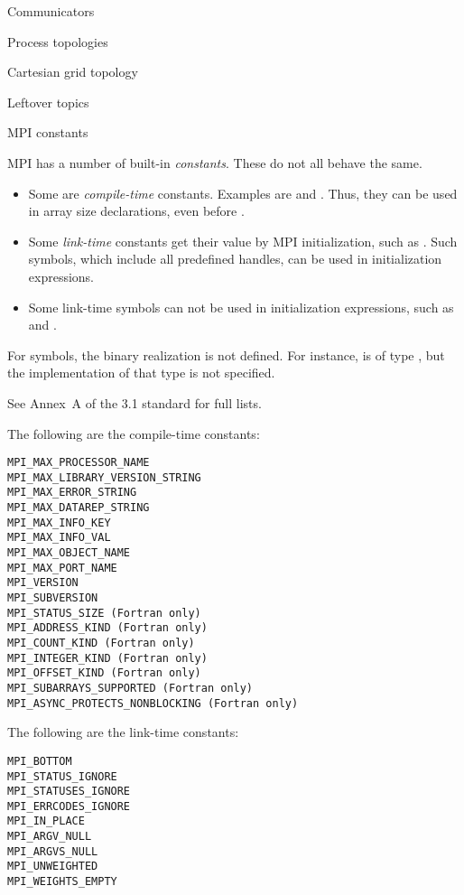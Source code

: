  {Communicators}

 {Process topologies}
\label{sec:ref:topology}

 {Cartesian grid topology}
\label{sec:ref:cartesian}

 {Leftover topics}

 {MPI constants}

MPI has a number of built-in \emph{constants}. These do not all behave
the same.
\begin{itemize}
\item Some are \emph{compile-time}
  constants. Examples are  and
  . Thus, they can be used in
  array size declarations, even before .
\item Some \emph{link-time}
  constants get their value by MPI initialization, such as
  . Such symbols, which include all
  predefined handles, can be used in initialization expressions.
\item Some link-time symbols can not be used in initialization
  expressions, such as  and .
\end{itemize}

For symbols, the binary realization is not defined. For instance,
 is of type , but
the implementation of that type is not specified.

See Annex~A of the 3.1 standard for full lists.

The following are the compile-time constants:
\begin{lstlisting}
MPI_MAX_PROCESSOR_NAME
MPI_MAX_LIBRARY_VERSION_STRING
MPI_MAX_ERROR_STRING
MPI_MAX_DATAREP_STRING
MPI_MAX_INFO_KEY
MPI_MAX_INFO_VAL
MPI_MAX_OBJECT_NAME
MPI_MAX_PORT_NAME
MPI_VERSION
MPI_SUBVERSION
MPI_STATUS_SIZE (Fortran only)
MPI_ADDRESS_KIND (Fortran only)
MPI_COUNT_KIND (Fortran only)
MPI_INTEGER_KIND (Fortran only)
MPI_OFFSET_KIND (Fortran only)
MPI_SUBARRAYS_SUPPORTED (Fortran only)
MPI_ASYNC_PROTECTS_NONBLOCKING (Fortran only)
\end{lstlisting}

The following are the link-time constants:
\begin{lstlisting}
MPI_BOTTOM
MPI_STATUS_IGNORE
MPI_STATUSES_IGNORE
MPI_ERRCODES_IGNORE
MPI_IN_PLACE
MPI_ARGV_NULL
MPI_ARGVS_NULL
MPI_UNWEIGHTED
MPI_WEIGHTS_EMPTY
\end{lstlisting}

